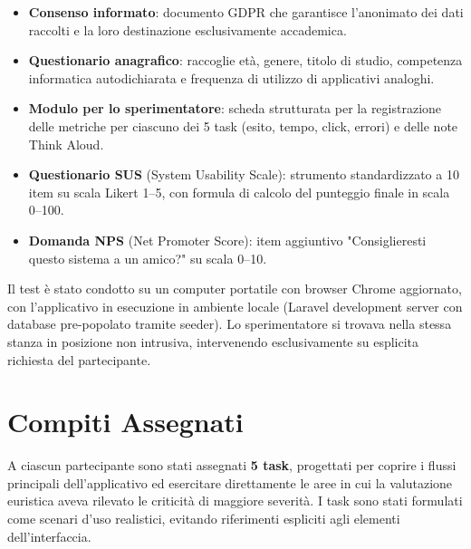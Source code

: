 \begin{itemize}
    \item \textbf{Consenso informato}: documento GDPR che garantisce l'anonimato dei dati raccolti e la loro destinazione esclusivamente accademica.
    \item \textbf{Questionario anagrafico}: raccoglie età, genere, titolo di studio, competenza informatica autodichiarata e frequenza di utilizzo di applicativi analoghi.
    \item \textbf{Modulo per lo sperimentatore}: scheda strutturata per la registrazione delle metriche per ciascuno dei 5 task (esito, tempo, click, errori) e delle note Think Aloud.
    \item \textbf{Questionario SUS} (System Usability Scale): strumento standardizzato a 10 item su scala Likert 1--5, con formula di calcolo del punteggio finale in scala 0--100.
    \item \textbf{Domanda NPS} (Net Promoter Score): item aggiuntivo "Consiglieresti questo sistema a un amico?" su scala 0--10.
\end{itemize}

Il test è stato condotto su un computer portatile con browser Chrome aggiornato, con l'applicativo in esecuzione in ambiente locale (Laravel development server con database pre-popolato tramite seeder). Lo sperimentatore si trovava nella stessa stanza in posizione non intrusiva, intervenendo esclusivamente su esplicita richiesta del partecipante.

\section{Compiti Assegnati}

A ciascun partecipante sono stati assegnati \textbf{5 task}, progettati per coprire i flussi principali dell'applicativo ed esercitare direttamente le aree in cui la valutazione euristica aveva rilevato le criticità di maggiore severità. I task sono stati formulati come scenari d'uso realistici, evitando riferimenti espliciti agli elementi dell'interfaccia.

